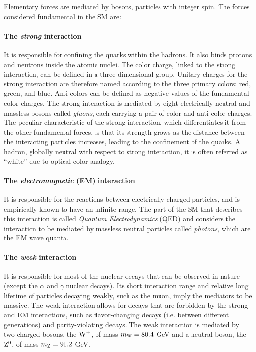 Elementary forces are mediated by bosons, particles with integer spin. The forces considered fundamental in the SM are:

\paragraph{The \emph{strong} interaction}It is responsible for confining the quarks within the hadrons. It also binds protons and neutrons inside the atomic nuclei. The color charge, linked to the strong interaction, can be defined in a three dimensional group. Unitary charges for the strong interaction are therefore named according to the three primary colors: red, green, and blue. Anti-colors can be defined as negative values of the fundamental color charges. The strong interaction is mediated by eight electrically neutral and massless bosons called \emph{gluons}, each carrying a pair of color and anti-color charges. The peculiar characteristic of the strong interaction, which differentiates it from the other fundamental forces, is that its strength grows as  the distance between the interacting particles increases, leading to the confinement of the quarks. A hadron, globally neutral with respect to strong interaction, it is often referred as ``white'' due to optical color analogy.

\paragraph{The \emph{electromagnetic} (EM) interaction}It is responsible for the reactions between electrically charged particles, and is empirically known to have an infinite range. The part of the SM that describes this interaction is called \emph{Quantum Electrodynamics} (QED) and considers the interaction to be mediated by massless neutral particles called \emph{photons}, which are the EM wave quanta.

\paragraph{The \emph{weak} interaction}It is responsible for most of the nuclear decays that can be observed in nature (except the $\alpha$ and $\gamma$ nuclear decays). Its short interaction range and relative long lifetime of particles decaying weakly, such as the muon, imply the mediators to be massive. The weak interaction allows for decays that are forbidden by the strong and EM interactions, such as flavor-changing decays (i.e. between different generations) and parity-violating decays. The weak interaction is mediated by two charged bosons, the $\mathrm{W}^\pm$, of mass $m_{\mathrm{W}} = 80.4$ GeV and a neutral boson, the $\mathrm{Z}^{0}$, of mass $m_{\mathrm{Z}} = 91.2$ GeV.

